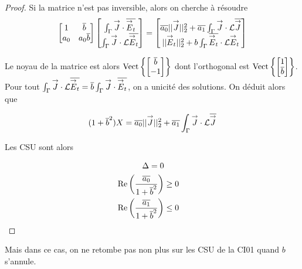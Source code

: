 \begin{proof}
        Si la matrice n'est pas inversible, alors on cherche à résoudre
        \[
          \begin{bmatrix}
            1 & {\overline{b}} \\
            a_0 & a_0{\overline{b}}
          \end{bmatrix}
          \begin{bmatrix}
            \int_\Gamma {\overset{\rightarrow}{J}} \cdot {\overline{{\overset{\rightarrow}{E}}_t}} \\
            \int_\Gamma {\overset{\rightarrow}{J}} \cdot \mathcal{L}{\overline{{\overset{\rightarrow}{E}}_t}}
          \end{bmatrix}
          =
          \begin{bmatrix}
            {\overline{a_0}}||{\overset{\rightarrow}{J}}||_2^2 + {\overline{a_1}}\int_\Gamma {\overset{\rightarrow}{J}} \cdot \mathcal{L}{\overline{{\overset{\rightarrow}{J}}}} \\
            ||{\overset{\rightarrow}{E}}_t||_2^2 + b\int_\Gamma {\overline{{\overset{\rightarrow}{E}}_t}} \cdot \mathcal{L}{\overset{\rightarrow}{E}}_t
          \end{bmatrix}
        \]

        Le noyau de la matrice est alors \(\operatorname{Vect}\left\lbrace\begin{bmatrix}{\overline{b}}\\-1\end{bmatrix}\right\rbrace\) dont l'orthogonal est  \(\operatorname{Vect}\left\lbrace\begin{bmatrix}1\\{\overline{b}}\end{bmatrix}\right\rbrace\).
        Pour tout \(\int_\Gamma {\overset{\rightarrow}{J}}\cdot \mathcal{L}{\overline{{\overset{\rightarrow}{E}}_t}} = {\overline{b}} \int_\Gamma {\overset{\rightarrow}{J}} \cdot {\overline{{\overset{\rightarrow}{E}}_t}} \), on a unicité des solutions. On déduit alors que

        \[
          (1 + {\overline{b}}^2) X = {\overline{a_0}} ||{\overset{\rightarrow}{J}}||_2^2 + {\overline{a_1}}\int_\Gamma {\overset{\rightarrow}{J}} \cdot \mathcal{L}{\overline{{\overset{\rightarrow}{J}}}}
        \]

        Les CSU sont alors

        \begin{align}
          \Delta = 0 \\
          \operatorname{Re}\left(\dfrac{{\overline{a_0}}}{1 + {\overline{b}}^2}\right) &\ge 0 \\
          \operatorname{Re}\left(\dfrac{{\overline{a_1}}}{1 + {\overline{b}}^2}\right) &\le 0
        \end{align}

      \end{proof}

      Mais dans ce cas, on ne retombe pas non plus sur les CSU de la CI01 quand \(b\) s'annule. 


